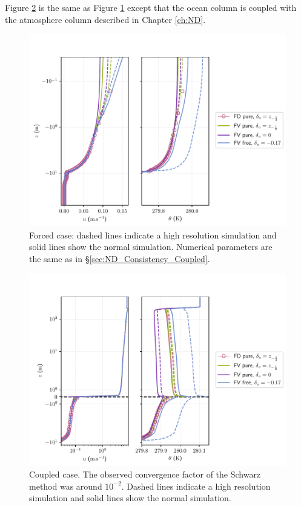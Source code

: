 Figure \ref{fig:OceanND_OSL_Coupled}
is the same as Figure 
\ref{fig:OceanND_OSL_Forced} except that the ocean column is coupled
with the atmosphere column described in Chapter \ref{ch:ND}.
\begin{figure}
	\centering
\includegraphics[scale=0.6]{images/oce_Forced.pdf}
	\caption{Forced case: dashed lines indicate
	a high resolution simulation and solid lines
	show the normal simulation. Numerical parameters
	are the same as in \S \ref{sec:ND_Consistency_Coupled}.}
	\label{fig:OceanND_OSL_Forced}
\end{figure}
\begin{figure}
	\centering
\includegraphics[scale=0.6]{images/oce_Coupled.pdf}
	\caption{Coupled case. The observed convergence factor
	of the Schwarz method was around $10^{-2}$.
	Dashed lines indicate
	a high resolution simulation and solid lines
	show the normal simulation.}
	\label{fig:OceanND_OSL_Coupled}
\end{figure}
